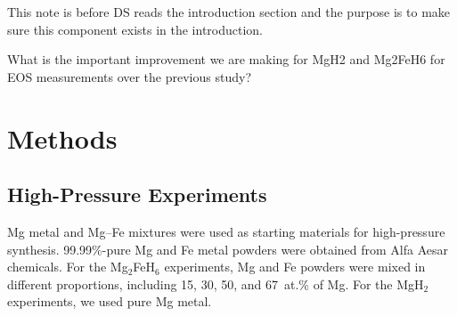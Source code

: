 \documentclass[draft,jgrga,12pt]{agujournal2019}
\begin{document}



\begin{cbox}
    This note is before DS reads the introduction section and the purpose is to make sure this component exists in the introduction.

    What is the important improvement we are making for MgH2 and Mg2FeH6 for EOS measurements over the previous study?\\
\end{cbox}


\section{Methods}

\subsection{High-Pressure Experiments}

Mg metal and Mg–Fe mixtures were used as starting materials for high-pressure synthesis.
99.99\%-pure Mg and Fe metal powders were obtained from Alfa Aesar chemicals. 
For the Mg$_2$FeH$_6$ experiments, Mg and Fe powders were mixed in different proportions, including 15, 30, 50, and 67~{at.\%} of Mg. 
For the MgH$_2$ experiments, we used pure Mg metal.
\end{document}
